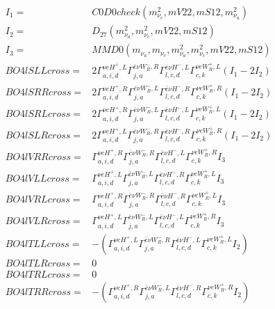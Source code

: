 \documentclass[A4,landscape]{article}
\begin{document}
\begin{align} 
I_1 = & C0D0check(m^2_{\nu_{{c}}}, mV22, mS12, m^2_{\nu_{{a}}}) \\ 
I_2 = & D_{27}(m^2_{\nu_{{a}}}, m^2_{\nu_{{c}}}, mV22, mS12) \\ 
I_3 = & MMD0(m_{\nu_{{a}}}, m_{\nu_{{c}}}, m^2_{\nu_{{a}}}, m^2_{\nu_{{c}}}, mV22, mS12) \\ 
  BO4lSLLcross= & 2  \Gamma^{\nu e H^+,L}_{a, i, d} \Gamma^{\bar{e}\nu W_R^- ,R}_{j, a} \Gamma^{\bar{e}\nu H^- ,L}_{l, c, d} \Gamma^{\nu e W_R^+,L}_{c, k} (I_1 - 2 I_2) \\ 
  BO4lSRRcross= & 2  \Gamma^{\nu e H^+,R}_{a, i, d} \Gamma^{\bar{e}\nu W_R^- ,L}_{j, a} \Gamma^{\bar{e}\nu H^- ,R}_{l, c, d} \Gamma^{\nu e W_R^+,R}_{c, k} (I_1 - 2 I_2) \\ 
  BO4lSRLcross= & 2  \Gamma^{\nu e H^+,R}_{a, i, d} \Gamma^{\bar{e}\nu W_R^- ,L}_{j, a} \Gamma^{\bar{e}\nu H^- ,L}_{l, c, d} \Gamma^{\nu e W_R^+,L}_{c, k} (I_1 - 2 I_2) \\ 
  BO4lSLRcross= & 2  \Gamma^{\nu e H^+,L}_{a, i, d} \Gamma^{\bar{e}\nu W_R^- ,R}_{j, a} \Gamma^{\bar{e}\nu H^- ,R}_{l, c, d} \Gamma^{\nu e W_R^+,R}_{c, k} (I_1 - 2 I_2) \\ 
  BO4lVRRcross= &  \Gamma^{\nu e H^+,R}_{a, i, d} \Gamma^{\bar{e}\nu W_R^- ,R}_{j, a} \Gamma^{\bar{e}\nu H^- ,L}_{l, c, d} \Gamma^{\nu e W_R^+,R}_{c, k} I_3 \\ 
  BO4lVLLcross= &  \Gamma^{\nu e H^+,L}_{a, i, d} \Gamma^{\bar{e}\nu W_R^- ,L}_{j, a} \Gamma^{\bar{e}\nu H^- ,R}_{l, c, d} \Gamma^{\nu e W_R^+,L}_{c, k} I_3 \\ 
  BO4lVRLcross= &  \Gamma^{\nu e H^+,R}_{a, i, d} \Gamma^{\bar{e}\nu W_R^- ,R}_{j, a} \Gamma^{\bar{e}\nu H^- ,R}_{l, c, d} \Gamma^{\nu e W_R^+,L}_{c, k} I_3 \\ 
  BO4lVLRcross= &  \Gamma^{\nu e H^+,L}_{a, i, d} \Gamma^{\bar{e}\nu W_R^- ,L}_{j, a} \Gamma^{\bar{e}\nu H^- ,L}_{l, c, d} \Gamma^{\nu e W_R^+,R}_{c, k} I_3 \\ 
  BO4lTLLcross= & -( \Gamma^{\nu e H^+,L}_{a, i, d} \Gamma^{\bar{e}\nu W_R^- ,R}_{j, a} \Gamma^{\bar{e}\nu H^- ,L}_{l, c, d} \Gamma^{\nu e W_R^+,L}_{c, k} I_2) \\ 
  BO4lTLRcross= & 0 \\ 
  BO4lTRLcross= & 0 \\ 
  BO4lTRRcross= & -( \Gamma^{\nu e H^+,R}_{a, i, d} \Gamma^{\bar{e}\nu W_R^- ,L}_{j, a} \Gamma^{\bar{e}\nu H^- ,R}_{l, c, d} \Gamma^{\nu e W_R^+,R}_{c, k} I_2) \\ 
\end{align} 
\end{document}
